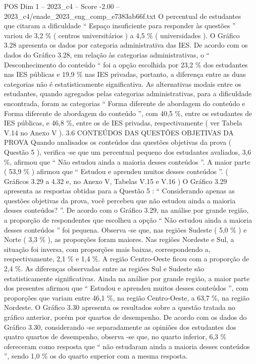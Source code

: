 \begin{textsample}{POS Dim 1 – 2023\_c4 – Score -2.00 – 2023\_c4/enade\_2023\_eng\_comp\_e7383ab66f.txt}
O percentual de estudantes que citaram a dificuldade “ Espaço insuficiente para responder às questões ” variou de 3,2 \% ( centros universitários ) a 4,5 \% ( universidades ).
O Gráfico 3.28 apresenta os dados por categoria administrativa das IES.
De acordo com os dados do Gráfico 3.28, em relação às categorias administrativas, o “ Desconhecimento do conteúdo “ foi a opção escolhida por 23,2 \% dos estudantes nas IES públicas e 19,9 \% nas IES privadas, portanto, a diferença entre as duas categorias não é estatisticamente significativa.
As alternativas modais entre os estudantes, quando agregados pelas categorias administrativas, para a dificuldade encontrada, foram as categorias “ Forma diferente de abordagem do conteúdo e Forma diferente de abordagem do conteúdo ”, com 40,5 \%, entre os estudantes de IES públicas, e 46,8 \%, entre os de IES privadas, respectivamente ( ver Tabela V.14 no Anexo V ). 3.6 CONTEÚDOS DAS QUESTÕES OBJETIVAS DA PROVA Quando analisados os conteúdos das questões objetivas da prova ( Questão 5 ), verifica -se que um percentual pequeno dos estudantes avaliados, 3,6 \%, afirmou que “ Não estudou ainda a maioria desses conteúdos ”.
A maior parte ( 53,9 \% ) afirmou que “ Estudou e aprendeu muitos desses conteúdos ”. ( Gráficos 3.29 a 4.32 e, no Anexo V, Tabelas V.15 e V.16 ) O Gráfico 3.29 apresenta as respostas obtidas para a Questão 5 : “ Considerando apenas as questões objetivas da prova, você percebeu que não estudou ainda a maioria desses conteúdos? ”.
De acordo com o Gráfico 3.29, na análise por grande região, a proporção de respondentes que escolheu a opção “ Não estudou ainda a maioria desses conteúdos ” foi pequena.
Observa -se que, nas regiões Sudeste ( 5,0 \% ) e Norte ( 3,3 \% ), as proporções foram maiores.
Nas regiões Nordeste e Sul, a situação foi inversa, com proporções mais baixas, correspondendo a, respectivamente, 2,1 \% e 1,4 \%.
A região Centro-Oeste ficou com a proporção de 2,4 \%.
As diferenças observadas entre as regiões Sul e Sudeste são estatisticamente significativas.
Ainda na análise por grande região, a maior parte dos presentes afirmou que “ Estudou e aprendeu muitos desses conteúdos ”, com proporções que variam entre 46,1 \%, na região Centro-Oeste, a 63,7 \%, na região Nordeste.
O Gráfico 3.30 apresenta os resultados sobre a questão tratada no gráfico anterior, porém por quartos de desempenho.
De acordo com os dados do Gráfico 3.30, considerando -se separadamente as opiniões dos estudantes dos quatro quartos de desempenho, observa -se que, no quarto inferior, 6,3 \% ofereceram como resposta que “ não estudaram ainda a maioria desses conteúdos ”, sendo 1,0 \% os do quarto superior com a mesma resposta.

\end{textsample}
